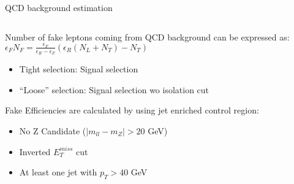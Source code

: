 \documentclass[8pt]{beamer}
\begin{document}
 
 \begin{frame}{QCD background estimation}
 
  \begin{columns}
  \begin{column}{11cm}
      
  Number of fake leptons coming from QCD background can be expressed as: \\
  \vspace{0.2cm}
  \hspace{0.6cm}
  $\epsilon_F N_F=\frac{\epsilon_{F}}{\epsilon_{R}-\epsilon_{F}}\left(\epsilon_{R}(N_{L}+N_{T})-N_{T}\right)$

  
  \vspace{0.5cm}
  
  
  \begin{itemize}
   \item Tight selection: Signal selection 
   \item ``Loose'' selection: Signal selection wo isolation cut
  \end{itemize}
  
  \vspace{0.5cm}
  Fake Efficiencies are calculated by using jet enriched control region:
  \begin{itemize}
   \item No Z Candidate ($|m_{ll}-m_{Z}| > 20$ GeV)
   \item Inverted $E_{T}^{miss}$ cut
   \item At least one jet with $p_{T} > 40$ GeV
  \end{itemize}

    
  \normalsize
  \end{column}
  \begin{column}{1cm}
  \end{column}
 \end{columns}

 \end{frame}


% 
% 
\end{document}
